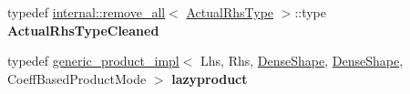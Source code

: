 \begin{DoxyCompactItemize}
typedef \mbox{\hyperlink{struct_eigen_1_1internal_1_1remove__all}{internal\+::remove\+\_\+all}}$<$ \mbox{\hyperlink{struct_eigen_1_1internal_1_1true__type}{Actual\+Rhs\+Type}} $>$\+::type {\bfseries Actual\+Rhs\+Type\+Cleaned}
\item 
\mbox{\label{struct_eigen_1_1internal_1_1generic__product__impl_3_01_lhs_00_01_rhs_00_01_dense_shape_00_01_def53e16cb724bbb32f6918835a9970bd5_ae345bf5bf9e77559889870998f0518f9}} 
typedef \mbox{\hyperlink{struct_eigen_1_1internal_1_1generic__product__impl}{generic\+\_\+product\+\_\+impl}}$<$ Lhs, Rhs, \mbox{\hyperlink{struct_eigen_1_1_dense_shape}{Dense\+Shape}}, \mbox{\hyperlink{struct_eigen_1_1_dense_shape}{Dense\+Shape}}, Coeff\+Based\+Product\+Mode $>$ {\bfseries lazyproduct}
\end{DoxyCompactItemize}
